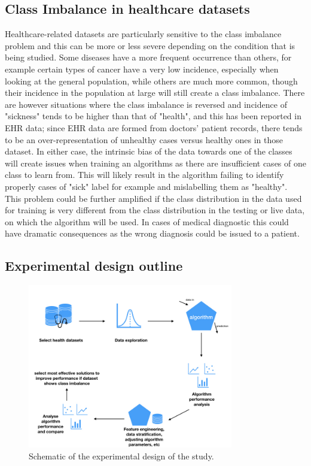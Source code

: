 \subsection{Class Imbalance in healthcare datasets}
Healthcare-related datasets are particularly sensitive to the class imbalance problem and this can be more or less severe depending on the condition that is being studied. Some diseases have a more frequent occurrence than others, for example certain types of cancer have a very low incidence, especially when looking at the general population, while others are much more common, though their incidence in the population at large will still create a class imbalance. There are however situations where the class imbalance is reversed and incidence of "sickness" tends to be higher than that of "health", and this has been reported in EHR data; since EHR data are formed from doctors' patient records, there tends to be an over-representation of unhealthy cases versus healthy ones in those dataset. In either case, the intrinsic bias of the data towards one of the classes will create issues when training an algorithms as there are insufficient cases of one class to learn from. This will likely result in the algorithm failing to identify properly cases of "sick" label for example and mislabelling them as "healthy". This problem could be further amplified if the class distribution in the data used for training is very different from the class distribution in the testing or live data, on which the algorithm will be used.
In cases of medical diagnostic this could have dramatic consequences as the wrong diagnosis could be issued to a patient. 


\subsection{Experimental design outline}


\begin{figure}[H]
    \centering
    \includegraphics[width=0.8\textwidth]{ThesisTemplate/usingLatex/images/Chapter3Figures001.jpeg}
    \caption{Schematic of the experimental design of the study.}
    \label{fig:my_label}
\end{figure}

